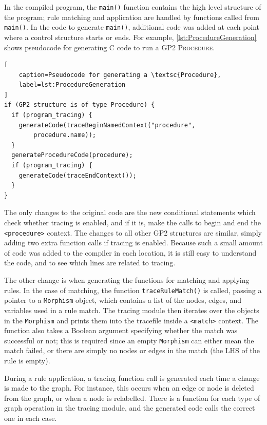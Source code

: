 \documentclass[authoryearcitations]{UoYCSproject}
\begin{document}
In the compiled program, the \texttt{main()} function contains the high level
structure of the program; rule matching and application are handled by functions
called from \texttt{main()}. In the code to generate \texttt{main()}, additional
code was added at each point where a control structure starts or ends. For example,
\autoref{lst:ProcedureGeneration} shows pseudocode for generating C code to
run a GP2 \textsc{Procedure}. 

\begin{lstlisting}[
    caption=Pseudocode for generating a \textsc{Procedure},
    label=lst:ProcedureGeneration
]
if (GP2 structure is of type Procedure) {
  if (program_tracing) {
    generateCode(traceBeginNamedContext("procedure",
        procedure.name));
  }
  generateProcedureCode(procedure);
  if (program_tracing) {
    generateCode(traceEndContext());
  }
}
\end{lstlisting}
 
The only changes to the original code are the new conditional statements which
check whether tracing is enabled, and if it is, make the calls to begin and end
the \texttt{<procedure>} context. The changes to all other GP2 structures are
similar, simply adding two extra function calls if tracing is enabled. Because
such a small amount of code was added to the compiler in each location, it is
still easy to understand the code, and to see which lines are related to tracing.

The other change is when generating the functions for matching and applying rules.
In the case of matching, the  function \texttt{traceRuleMatch()} is called,
passing a pointer to a \texttt{Morphism} object, which contains a list of the
nodes, edges, and variables used in a rule match. The tracing module then 
iterates over the objects in the \texttt{Morphism} and prints them into the
tracefile inside a \texttt{<match>} context. The function also takes a Boolean
argument specifying whether the match was successful or not; this is required
since an empty \texttt{Morphism} can either mean the match failed, or there are
simply no nodes or edges in the match (the LHS of the rule is empty).

During a rule application, a tracing function call is generated each time a
change is made to the graph. For instance, this occurs when an edge or node is
deleted from the graph, or when a node is relabelled. There is a function for each
type of graph operation in the tracing module, and the generated code calls the
correct one in each case.
\end{document}

